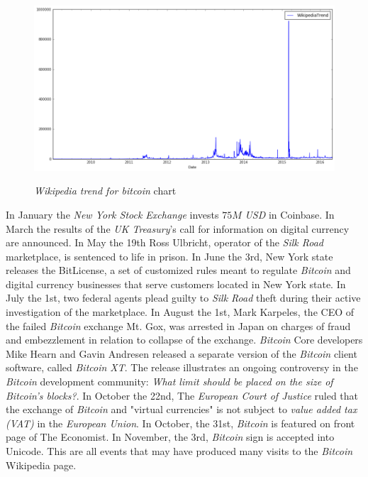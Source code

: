 \begin{figure}[bth]
  \myfloatalign
  {\includegraphics[width=1\linewidth]
    {gfx/wikipedia-trend-for-bitcoin-over-time}}
  \caption{\textit{Wikipedia trend for bitcoin}
    chart}
  \label{fig:wikipedia-trend-for-bitcoin-over-time}
\end{figure}

In January the \textit{New York Stock Exchange} invests $75M$
\textit{USD} in Coinbase. In March the results of the \textit{UK
Treasury}'s call for information on digital currency are announced. In
May the 19th Ross Ulbricht, operator of the \textit{Silk Road}
marketplace, is sentenced to life in prison. In June the 3rd, New York
state releases the BitLicense, a set of customized rules meant to
regulate \textit{Bitcoin} and digital currency businesses that serve
customers located in New York state. In July the 1st, two federal
agents plead guilty to \textit{Silk Road} theft during their active
investigation of the marketplace. In August the 1st, Mark Karpeles,
the CEO of the failed \textit{Bitcoin} exchange Mt. Gox, was arrested
in Japan on charges of fraud and embezzlement in relation to collapse
of the exchange. \textit{Bitcoin} Core developers Mike Hearn and Gavin
Andresen released a separate version of the \textit{Bitcoin} client
software, called \textit{Bitcoin XT}. The release illustrates an
ongoing controversy in the \textit{Bitcoin} development community:
\textit{What limit should be placed on the size of \textit{Bitcoin}'s
blocks?}. In October the 22nd, The \textit{European Court of Justice}
ruled that the exchange of \textit{Bitcoin} and "virtual currencies"
is not subject to \textit{value added tax (VAT)} in the
\textit{European Union}. In October, the 31st, \textit{Bitcoin} is
featured on front page of The Economist. In November, the 3rd,
\textit{Bitcoin} sign is accepted into Unicode. This are all events
that may have produced many visits to the \textit{Bitcoin} Wikipedia
page.

